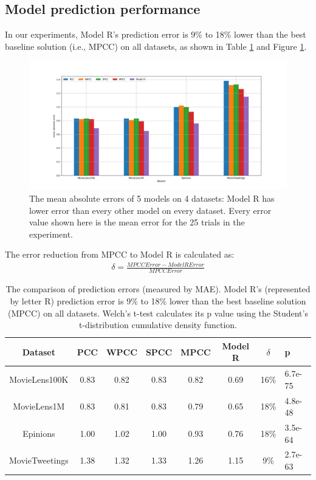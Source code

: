 \documentclass[12pt]{WSUThesis}
\theoremstyle{definition}
\begin{document}
\subsection{Model prediction performance}
In our experiments, Model R's prediction error is 9\% to 18\% lower than the best baseline solution (i.e., MPCC) on all datasets, as shown in Table 
\ref{tab:rating-errors} and Figure \ref{fig:rating-errors}.
\begin{figure}[!ht]\centering
	\includegraphics[width=1\textwidth]{rating-errors}
	\caption{
		The mean absolute errors of 5 models on 4 datasets:
		Model R has lower error than every other model on every dataset.
		Every error value shown here is the mean error for the 25 trials in the experiment.
	}
	\label{fig:rating-errors}
\end{figure}
The error reduction from MPCC to Model R is calculated as:
\begin{align*}
\delta = \frac{MPCCError - ModelRError}{MPCCError}
\end{align*}
\begin{table}[!htb]
	\centering
	\caption{
		The comparison of prediction errors (measured by MAE).
		Model R's (represented by letter R) prediction error is 9\% to 18\%
		lower than the best baseline 
		solution (MPCC) on all datasets.
		Welch's t-test calculates its p value using the Student's t-distribution cumulative density function.
	}
	\begin{tabular}{cccccccl} \hline
		Dataset & PCC & WPCC & SPCC & MPCC & Model R & $ \delta $ & p \\ \hline
		MovieLens100K & 0.83 & 0.82 & 0.83 & 0.82 & 0.69 & 16\% & 6.7e-75 \\ \hline
		MovieLens1M & 0.83 & 0.81 & 0.83 & 0.79 & 0.65 & 18\% & 4.8e-48 \\ \hline
		Epinions & 1.00 & 1.02 & 1.00 & 0.93 & 0.76 & 18\% & 3.5e-64 \\ \hline
		MovieTweetings & 1.38 & 1.32 & 1.33 & 1.26 & 1.15 & 9\%  & 2.7e-63 \\ \hline
	\end{tabular}
	\label{tab:rating-errors}
\end{table}
\end{document}
